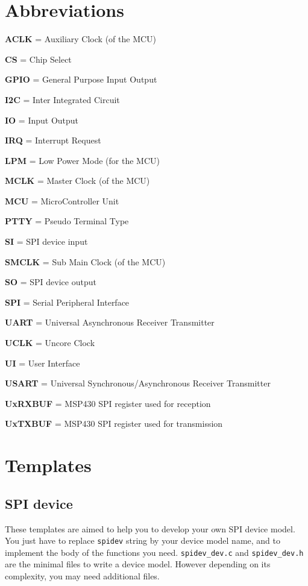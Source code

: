 \documentclass[a4paper,10pt]{report}
\begin{document}
\section{Abbreviations}
\begin{description}
  \item \textbf{ACLK} = Auxiliary Clock (of the MCU)
  \item \textbf{CS} = Chip Select
  \item \textbf{GPIO} = General Purpose Input Output
  \item \textbf{I2C} = Inter Integrated Circuit
  \item \textbf{IO} = Input Output
  \item \textbf{IRQ} = Interrupt Request
  \item \textbf{LPM} = Low Power Mode (for the MCU)
  \item \textbf{MCLK} = Master Clock (of the MCU)
  \item \textbf{MCU} = MicroController Unit
  \item \textbf{PTTY} = Pseudo Terminal Type
  \item \textbf{SI} = SPI device input
  \item \textbf{SMCLK} = Sub Main Clock (of the MCU)
  \item \textbf{SO} = SPI device output
  \item \textbf{SPI} = Serial Peripheral Interface
  \item \textbf{UART} = Universal Asynchronous Receiver Transmitter
  \item \textbf{UCLK} = Uncore Clock
  \item \textbf{UI} = User Interface
  \item \textbf{USART} = Universal Synchronous/Asynchronous Receiver Transmitter
  \item \textbf{UxRXBUF} = MSP430 SPI register used for reception
  \item \textbf{UxTXBUF} = MSP430 SPI register used for transmission
\end{description}

\section{Templates}
\subsection{SPI device}
\label{spi-device-template}

These templates are aimed to help you to develop your own SPI device model. You just have to replace \verb$spidev$ string by your device model name, and to implement the body of the functions you need. \verb$spidev_dev.c$ and \verb$spidev_dev.h$ are the minimal files to write a device model. However depending on its complexity, you may need additional files.
\end{document}

